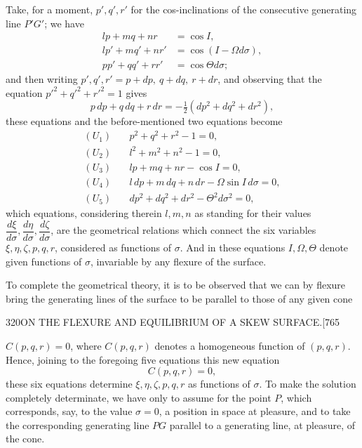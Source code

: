 \documentclass[11pt]{article}
\begin{document}
Take, for a moment, $p', q', r'$ for the cos-inclinations of the consecutive generating
line $P'G'$; we have
\begin{align*}
lp + mq + nr &= \cos I, \\
lp' + mq' + nr' &= \cos(I - \Omega d\sigma), \\
pp' + qq' + rr' &= \cos\Theta d\sigma;
\end{align*}
and then writing $p', q', r' = p + dp,\ q + dq,\ r + dr$, and observing that the equation
$p'^2 + q'^2 + r'^2 = 1$ gives
\[
p\,dp + q\,dq + r\,dr = -\tfrac{1}{2}(dp^2 + dq^2 + dr^2),
\]
these equations and the before-mentioned two equations become
\begin{align*}
(U_1)\quad & p^2 + q^2 + r^2 - 1 = 0, \\
(U_2)\quad & l^2 + m^2 + n^2 - 1 = 0, \\
(U_3)\quad & lp + mq + nr - \cos I = 0, \\
(U_4)\quad & l\,dp + m\,dq + n\,dr - \Omega\sin I\,d\sigma = 0, \\
(U_5)\quad & dp^2 + dq^2 + dr^2 - \Theta^2 d\sigma^2 = 0,
\end{align*}
which equations, considering therein $l, m, n$ as standing for their values $\dfrac{d\xi}{d\sigma}, \dfrac{d\eta}{d\sigma}, \dfrac{d\zeta}{d\sigma}$,
are the geometrical relations which connect the six variables $\xi, \eta, \zeta, p, q, r$, considered
as functions of $\sigma$. And in these equations $I, \Omega, \Theta$ denote given functions of $\sigma$,
invariable by any flexure of the surface.

To complete the geometrical theory, it is to be observed that we can by flexure
bring the generating lines of the surface to be parallel to those of any given cone

\begin{center}
{\small 320\hfill ON THE FLEXURE AND EQUILIBRIUM OF A SKEW SURFACE.\hfill [765}
\end{center}

$C(p, q, r) = 0$, where $C(p, q, r)$ denotes a homogeneous function of $(p, q, r)$. Hence,
joining to the foregoing five equations this new equation
\[
C(p, q, r) = 0,
\]
these six equations determine $\xi, \eta, \zeta, p, q, r$ as functions of $\sigma$. To make the
solution completely determinate, we have only to assume for the point $P$, which
corresponds, say, to the value $\sigma = 0$, a position in space at pleasure, and to take the
corresponding generating line $PG$ parallel to a generating line, at pleasure, of the cone.
\end{document}
